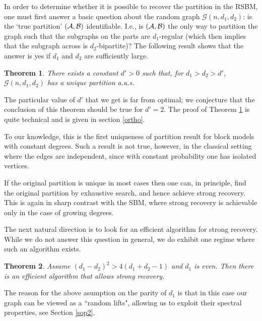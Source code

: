 \documentclass[11pt,reqno]{amsart}
\newtheorem{theorem}{Theorem}
\begin{document}
In order to determine whether it is possible to recover the partition
in the RSBM, one must first answer a basic question about the random
graph $\mathcal{G}(n,d_1,d_2)$: is the `true partition' $(\mathcal{A}, \mathcal{B})$ 
identifiable. I.e., is $(\mathcal{A}, \mathcal{B})$ the only way to partition the graph such that the subgraphs on the parts are $d_1$-regular (which then implies that the subgraph across is $d_2$-bipartite)? The following result shows that the answer is yes if $d_1$ and $d_2$ are sufficiently large.  

\begin{theorem}\label{uniqueness}  
There exists a constant $d'>0$ such that, for $d_1>d_2>d'$, $\mathcal{G}(n,d_1,d_2)$ has a unique partition a.a.s.
\end{theorem}

The particular value of $d'$ that we get is far from optimal; we
conjecture that the conclusion of this theorem should be true for
$d'=2$. The proof of Theorem \ref{uniqueness} is quite technical and is given in section \ref{ortho}.
 
To our knowledge, this is the first uniqueness of partition result for
block models with constant degrees. Such a result is not true,
however, in the classical setting where the edges are independent, since with constant probability one has isolated vertices.

If the original partition is unique in most cases then one can, in principle, find the original partition by
exhaustive search, and hence achieve strong recovery. This is again in
sharp contrast with the SBM, where strong recovery is achievable only
in the case of growing degrees. 

The next natural direction is to look for an efficient algorithm for strong recovery. 
While we do not answer this question in general, we do exhibit one regime where such an algorithm exists. 



\begin{theorem}\label{str12}
Assume $(d_1-d_2)^2> 4(d_1+d_2-1)$ and $d_1$ is even. Then there is an efficient algorithm that allows strong recovery.
\end{theorem} 

 The reason for the above asumption on the parity of $d_1$ is that in this case our graph can be viewed as a ``random lifts", allowing us to exploit their spectral properties, see Section \ref{sop2}. 
\end{document}
